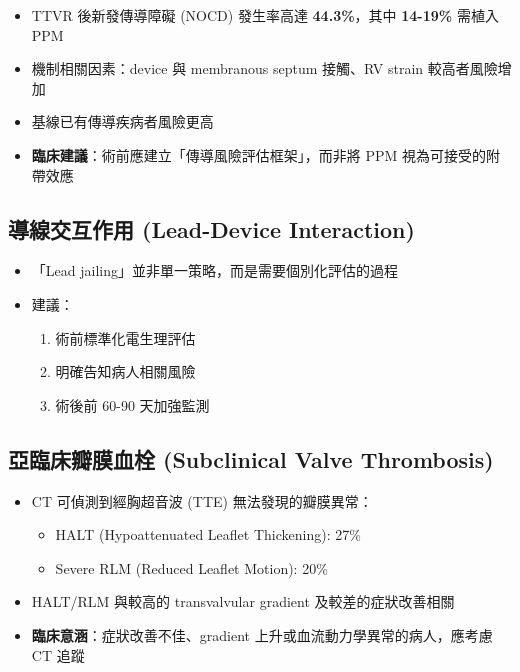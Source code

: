 \documentclass[12pt,a4paper]{article}
\begin{document}
\begin{itemize}[leftmargin=*]
    \item TTVR 後新發傳導障礙 (NOCD) 發生率高達 \textbf{44.3\%}，其中 \textbf{14-19\%} 需植入 PPM
    \item 機制相關因素：device 與 membranous septum 接觸、RV strain 較高者風險增加
    \item 基線已有傳導疾病者風險更高
    \item \textbf{臨床建議}：術前應建立「傳導風險評估框架」，而非將 PPM 視為可接受的附帶效應
\end{itemize}

\subsection{導線交互作用 (Lead-Device Interaction)}


\begin{itemize}[leftmargin=*]
    \item 「Lead jailing」並非單一策略，而是需要個別化評估的過程
    \item 建議：
    \begin{enumerate}[nosep]
        \item 術前標準化電生理評估
        \item 明確告知病人相關風險
        \item 術後前 60-90 天加強監測
    \end{enumerate}
\end{itemize}

\subsection{亞臨床瓣膜血栓 (Subclinical Valve Thrombosis)}

\begin{itemize}[leftmargin=*]
    \item CT 可偵測到經胸超音波 (TTE) 無法發現的瓣膜異常：
    \begin{itemize}[nosep]
        \item HALT (Hypoattenuated Leaflet Thickening): 27\%
        \item Severe RLM (Reduced Leaflet Motion): 20\%
    \end{itemize}
    \item HALT/RLM 與較高的 transvalvular gradient 及較差的症狀改善相關
    \item \textbf{臨床意涵}：症狀改善不佳、gradient 上升或血流動力學異常的病人，應考慮 CT 追蹤
\end{itemize}
\end{document}
